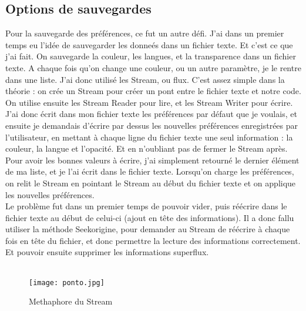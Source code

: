 \documentclass{article}
\begin{document}
                \subsection{Options de sauvegardes}
Pour la sauvegarde des préférences, ce fut un autre défi. J’ai dans un premier temps eu l’idée de sauvegarder les donneés dans un fichier texte. Et c’est ce que j’ai fait. On sauvegarde la couleur, les langues, et la transparence dans un fichier texte. A chaque fois qu’on change une couleur, ou un autre paramètre, je le rentre dans une liste. J’ai donc utilisé les Stream, ou flux. C’est assez simple dans la théorie : on crée un Stream pour créer un pont entre le fichier texte et notre code. On utilise ensuite les Stream Reader pour lire, et les Stream Writer pour écrire. J’ai donc écrit dans mon fichier texte les préférences par défaut que je voulais, et ensuite je demandais d’écrire par dessus les nouvelles préférences enregistrées par l’utilisateur, en mettant à chaque ligne du fichier texte une seul information : la couleur, la langue et l’opacité. Et en n’oubliant pas de fermer le Stream après. Pour avoir les bonnes valeurs à écrire, j’ai simplement retourné le dernier élément de ma liste, et je l’ai écrit dans le fichier texte. Lorsqu’on charge les préférences, on relit le Stream en pointant le Stream au début du fichier texte et on applique les nouvelles préférences.\\
Le problème fut dans un premier temps de pouvoir vider, puis réécrire dans le fichier texte au début de celui-ci (ajout en tête des informations). Il a donc fallu utiliser la méthode Seekorigine, pour demander au Stream de réécrire à chaque fois en tête du fichier, et donc permettre la lecture des informations correctement. Et pouvoir ensuite supprimer les informations superflux.\\

\\
    \begin{figure}[hp]
	    \centering
	    \texttt{[image: ponto.jpg]}
	    \caption{Methaphore du Stream}
    \end{figure}
\\
\end{document}
